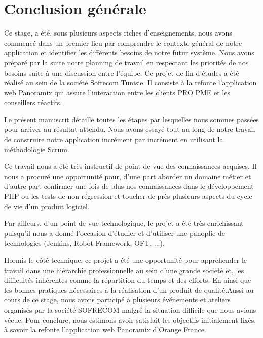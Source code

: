 \chapter*{Conclusion générale}

Ce stage, a été, sous plusieurs aspects riches d'enseignements, nous avons commencé dans un premier lieu par comprendre le contexte général de notre application et identifier les différents besoins de notre futur système. Nous avons préparé par la suite notre planning de travail en respectant les priorités de nos besoins suite à une discussion entre l'équipe. Ce projet de fin d'études a été réalisé au sein de la société Sofrecom Tunisie. Il consiste à la refonte l'application web Panoramix qui assure l'interaction entre les clients PRO PME et les conseillers réactifs.\\\newline

Le présent manuscrit détaille toutes les étapes par lesquelles nous sommes passées pour arriver au résultat attendu. Nous avons essayé tout au long de notre travail de construire notre application incrément par incrément en utilisant la méthodologie Scrum.\\\newline

Ce travail nous a été très instructif de point de vue des connaissances acquises. Il nous a procuré une opportunité pour, d'une part aborder un domaine métier et d'autre part confirmer une fois de plus nos connaissances dans le développement PHP ou les tests de non régression et toucher de près plusieurs aspects du cycle de vie d'un produit logiciel.\\\newline

Par ailleurs, d'un point de vue technologique, le projet a été très enrichissant puisqu'il nous a donné l'occasion d'étudier et d'utiliser une panoplie de technologies (Jenkins, Robot Framework, OFT, ...).\\\newline

Hormis le côté technique, ce projet a été une opportunité pour appréhender le travail dans une hiérarchie professionnelle au sein d'une grande société et, les difficultés inhérentes comme la répartition du temps et des efforts. En ainsi que les bonnes pratiques nécessaires à la réalisation d'un produit de qualité.Aussi au cours de ce stage, nous avons participé à plusieurs événements et ateliers organisés
par la société SOFRECOM malgré la situation difficile que nous avions vécue. Pour conclure, nous estimons avoir satisfait les objectifs initialement fixés, à savoir la refonte l'application web Panoramix d'Orange France.\\\newline

